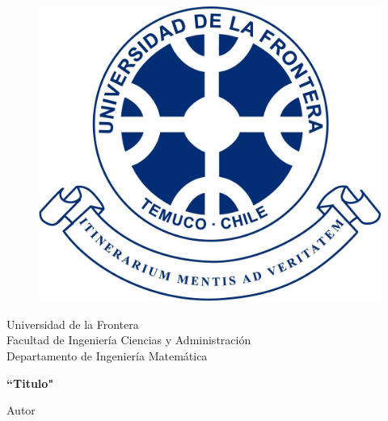 \documentclass[letter]{article}%
\begin{document}
\begin{titlepage}
	\begin{center}
		\begin{figure}[ht]
				\includegraphics[scale=0.15]{images/logoUFRO.jpg}
		\end{figure}
		\vspace{-3cm}
	\end{center}
	\begin{center}
		Universidad de la Frontera\\
		Facultad de Ingeniería Ciencias y Administración\\
		Departamento de Ingeniería Matemática
	\end{center}
	\vspace{7.5cm}
	\begin{center}
		\begin{Large}
			\textbf{``Titulo"}
		\end{Large}
	\end{center}
	\vspace{10cm}
	\begin{center}
		{\large Autor\\ \the\year}
	\end{center}
\end{titlepage}
\end{document}
